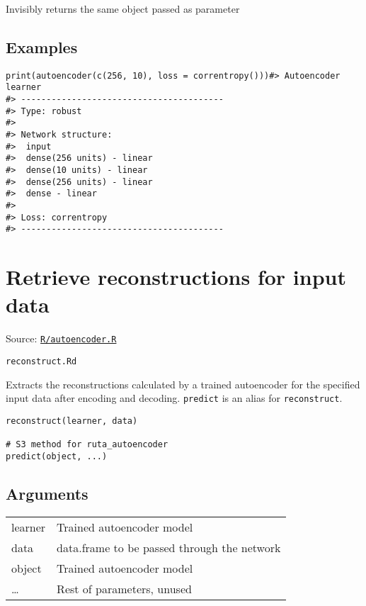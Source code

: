 Invisibly returns the same object passed as parameter

\hypertarget{examples}{\subsection{\texorpdfstring{\protect\hyperlink{examples}{}Examples}{Examples}}\label{examples}}

\begin{verbatim}
print(autoencoder(c(256, 10), loss = correntropy()))#> Autoencoder learner
#> ----------------------------------------
#> Type: robust 
#> 
#> Network structure:
#>  input
#>  dense(256 units) - linear
#>  dense(10 units) - linear
#>  dense(256 units) - linear
#>  dense - linear
#> 
#> Loss: correntropy 
#> ----------------------------------------
\end{verbatim}

\section{Retrieve reconstructions for input
data}\label{retrieve-reconstructions-for-input-data}

Source:
\href{https://github.com/fdavidcl/ruta/blob/master/R/autoencoder.R}{\texttt{R/autoencoder.R}}

\texttt{reconstruct.Rd}

Extracts the reconstructions calculated by a trained autoencoder for the
specified input data after encoding and decoding. \texttt{predict} is an
alias for \texttt{reconstruct}.

\begin{verbatim}
reconstruct(learner, data)

# S3 method for ruta_autoencoder
predict(object, ...)
\end{verbatim}

\hypertarget{arguments}{\subsection{\texorpdfstring{\protect\hyperlink{arguments}{}Arguments}{Arguments}}\label{arguments}}

\begin{longtable}[c]{@{}ll@{}}
\toprule
learner & Trained autoencoder model\tabularnewline
data & data.frame to be passed through the network\tabularnewline
object & Trained autoencoder model\tabularnewline
\ldots{} & Rest of parameters, unused\tabularnewline
\bottomrule
\end{longtable}

